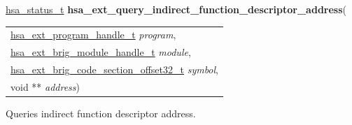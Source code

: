 \documentclass[final]{book}
\newcommand{\hsaarg}[1]{\textit{#1}}
\begin{document}
\noindent\begin{tcolorbox}[breakable,nobeforeafter,colframe=white,colback=lightgray,left=0mm]
\hyperlink{group__status_1gad755322e7ff95456520e8abdbe90d225}{hsa_status_t} \hypertarget{group__HsailLinkerServiceLayer_1gadab1b817d487fbca7acdb0499ef97874}{\textbf{hsa_ext_query_indirect_function_descriptor_address}}(
\vspace{-3.5mm}\begin{longtable}{@{}p{\textwidth}}
\hspace{1.7em}\hyperlink{group__HsailLinkerServiceLayer_1gaea8d90863414407ddba7e318db7412f9}{hsa_ext_program_handle_t} \hsaarg{program},\\
\hspace{1.7em}\hyperlink{group__FinalizerCoreApi_1ga0216996f5341a8591ecf9e0f6fd1b7e5}{hsa_ext_brig_module_handle_t} \hsaarg{module},\\
\hspace{1.7em}\hyperlink{group__FinalizerCoreApi_1ga494b8ac14a8c10af95b83b51a8a4ad7f}{hsa_ext_brig_code_section_offset32_t} \hsaarg{symbol},\\
\hspace{1.7em}void ** \hsaarg{address})\end{longtable}

\end{tcolorbox}
Queries indirect function descriptor address.
\end{document}

